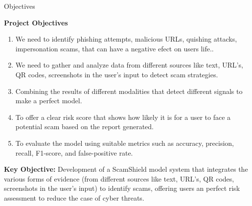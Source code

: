 \documentclass[aspectratio=169,11pt]{beamer}
\begin{document}
\begin{frame}{Objectives}

\scriptsize
\textbf{\color{GEUBlue}Project Objectives}

\vspace{1mm}

\begin{enumerate}\itemsep2pt \parskip0pt
    \item We need to identify phishing attempts, malicious URLs, quishing attacks, impersonation scams,  that can have a negative efect on users life..
    \item We need to gather and analyze data from different sources like text, URL's, QR codes, screenshots in the user's input to detect scam strategies. 
    \item Combining the results of different modalities that detect different signals to make a perfect model. 
    \item To offer a clear risk score that shows how likely it is for a user to face a potential scam based on the report generated. 
    \item To evaluate the model using suitable metrics such as
          accuracy, precision, recall, F1-score, and false-positive rate.
\end{enumerate}

\vspace{2mm}

\begin{center}
\footnotesize
\colorbox{GEULightBlue}{%
\parbox{.82\textwidth}{%
\centering
\textbf{Key Objective:}
Development of a ScamShield model system that integrates the various forms of evidence (from different sources like text, URL's, QR codes, screenshots in the user's input) to identify scams, offering users an perfect risk assessment to reduce the case of cyber threats. 
}}
\end{center}

\end{frame}
\end{document}
